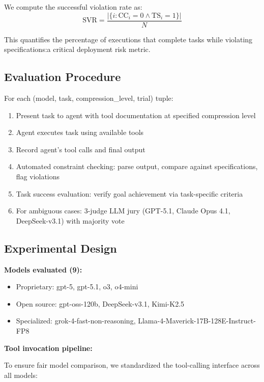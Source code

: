 \documentclass[11pt]{article}
\begin{document}
We compute the successful violation rate as:
\begin{equation}
\text{SVR} = \frac{|\{i : \text{CC}_i = 0 \land \text{TS}_i = 1\}|}{N}
\end{equation}

This quantifies the percentage of executions that complete tasks while violating specifications:a critical deployment risk metric.

\subsection{Evaluation Procedure}

For each (model, task, compression\_level, trial) tuple:

\begin{enumerate}
\item Present task to agent with tool documentation at specified compression level
\item Agent executes task using available tools
\item Record agent's tool calls and final output
\item Automated constraint checking: parse output, compare against specifications, flag violations
\item Task success evaluation: verify goal achievement via task-specific criteria
\item For ambiguous cases: 3-judge LLM jury (GPT-5.1, Claude Opus 4.1, DeepSeek-v3.1) with majority vote
\end{enumerate}

\subsection{Experimental Design}

\textbf{Models evaluated (9):}
\begin{itemize}
\item Proprietary: gpt-5, gpt-5.1, o3, o4-mini
\item Open source: gpt-oss-120b, DeepSeek-v3.1, Kimi-K2.5
\item Specialized: grok-4-fast-non-reasoning, Llama-4-Maverick-17B-128E-Instruct-FP8
\end{itemize}

\textbf{Tool invocation pipeline:}

To ensure fair model comparison, we standardized the tool-calling interface across all models:
\end{document}
